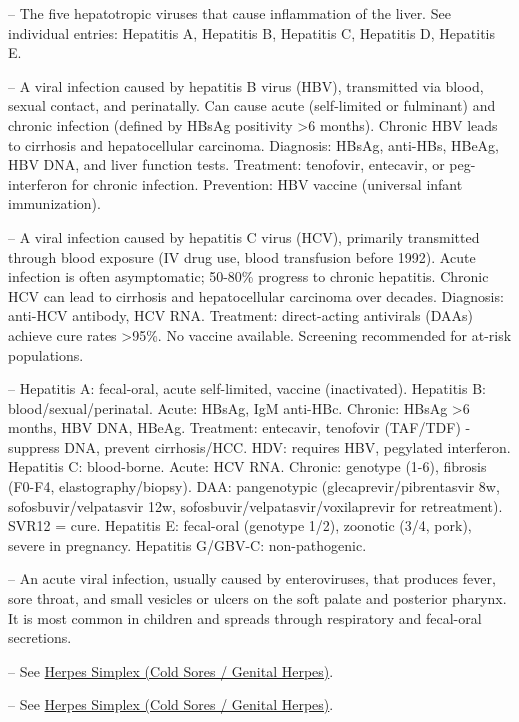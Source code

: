 -- The five hepatotropic viruses that cause inflammation of the liver. See individual entries: Hepatitis A, Hepatitis B, Hepatitis C, Hepatitis D, Hepatitis E.

-- A viral infection caused by hepatitis B virus (HBV), transmitted via blood, sexual contact, and perinatally. Can cause acute (self-limited or fulminant) and chronic infection (defined by HBsAg positivity >6 months). Chronic HBV leads to cirrhosis and hepatocellular carcinoma. Diagnosis: HBsAg, anti-HBs, HBeAg, HBV DNA, and liver function tests. Treatment: tenofovir, entecavir, or peg-interferon for chronic infection. Prevention: HBV vaccine (universal infant immunization).

-- A viral infection caused by hepatitis C virus (HCV), primarily transmitted through blood exposure (IV drug use, blood transfusion before 1992). Acute infection is often asymptomatic; 50-80\% progress to chronic hepatitis. Chronic HCV can lead to cirrhosis and hepatocellular carcinoma over decades. Diagnosis: anti-HCV antibody, HCV RNA. Treatment: direct-acting antivirals (DAAs) achieve cure rates >95\%. No vaccine available. Screening recommended for at-risk populations.

-- Hepatitis A: fecal-oral, acute self-limited, vaccine (inactivated). Hepatitis B: blood/sexual/perinatal. Acute: HBsAg, IgM anti-HBc. Chronic: HBsAg >6 months, HBV DNA, HBeAg. Treatment: entecavir, tenofovir (TAF/TDF) - suppress DNA, prevent cirrhosis/HCC. HDV: requires HBV, pegylated interferon. Hepatitis C: blood-borne. Acute: HCV RNA. Chronic: genotype (1-6), fibrosis (F0-F4, elastography/biopsy). DAA: pangenotypic (glecaprevir/pibrentasvir 8w, sofosbuvir/velpatasvir 12w, sofosbuvir/velpatasvir/voxilaprevir for retreatment). SVR12 = cure. Hepatitis E: fecal-oral (genotype 1/2), zoonotic (3/4, pork), severe in pregnancy. Hepatitis G/GBV-C: non-pathogenic.

-- An acute viral infection, usually caused by enteroviruses, that produces fever, sore throat, and small vesicles or ulcers on the soft palate and posterior pharynx. It is most common in children and spreads through respiratory and fecal-oral secretions.

-- See \hyperlink{Herpes Simplex (Cold Sores / Genital Herpes)}{Herpes Simplex (Cold Sores / Genital Herpes)}.

-- See \hyperlink{Herpes Simplex (Cold Sores / Genital Herpes)}{Herpes Simplex (Cold Sores / Genital Herpes)}.

